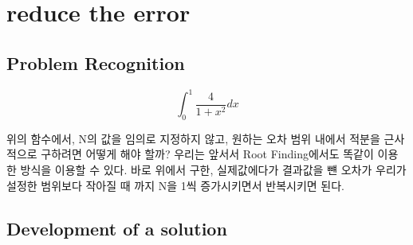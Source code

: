 \documentclass[11pt]{article}
\begin{document}
\section{reduce the error }
\subsection{Problem Recognition} 

\begin{equation}
\int_0^1 \frac{4}{1 + x^2} dx
\end{equation}

위의 함수에서, N의 값을 임의로 지정하지 않고, 원하는 오차 범위 내에서 적분을 근사적으로 구하려면 어떻게 해야 할까? 우리는 앞서서 Root Finding에서도 똑같이 이용한 방식을 이용할 수 있다. 바로 위에서 구한, 실제값에다가 결과값을 뺸 오차가 우리가 설정한 범위보다 작아질 때 까지 N을 1씩 증가시키면서 반복시키면 된다.

\subsection{Development of a solution} 
\end{document}
